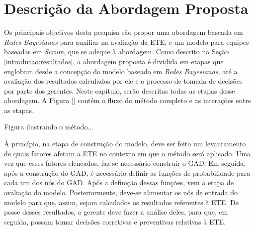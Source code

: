 \chapter{Descrição da Abordagem Proposta}
\label{descricao}

Os principais objetivos desta pesquisa são propor uma abordagem baseada em \textit{Redes Bayesianas} para auxiliar na avaliação da ETE, e um modelo para equipes baseadas em \textit{Scrum}, que se adeque à abordagem. Como descrito na Seção \ref{introducao:resultados}, a abordagem proposta é dividida em etapas que englobam desde a concepção do modelo baseado em \textit{Redes Bayesianas}, até a avaliação dos resultados calculados por ele e o processo de tomada de decisões por parte dos gerentes. Neste capítulo, serão descritas todas as etapas desse abordagem. A Figura \ref{} contém o fluxo do método completo e as interações entre as etapas.

{\color{red} Figura ilustrando o método...}

À princípio, na etapa de construção do modelo, deve ser feito um levantamento de quais fatores afetam a ETE no contexto em que o método será aplicado. Uma vez que esses fatores elencados, faz-se necessário construir o GAD. Em seguida, após a construção do GAD, é necessário definir as funções de probabilidade para cada um dos nós do GAD. Após a definição dessas funções, vem a etapa de avaliação do modelo. Posteriormente, deve-se alimentar os nós de entrada do modelo para que, assim, sejam calculados os resultados referentes à ETE. De posse desses resultados, o gerente deve fazer a análise deles, para que, em seguida, possam tomar decisões corretivas e preventivas relativas à ETE.
